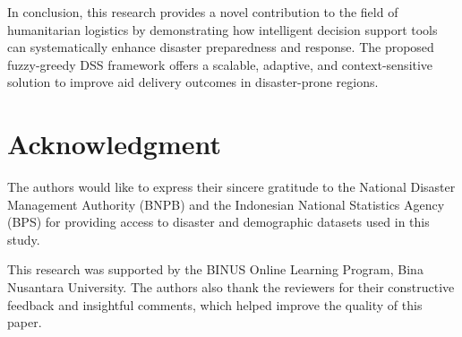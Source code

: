 \documentclass[journal,final,a4paper,twoside,11pt]{IEEEtran}
\begin{document}
In conclusion, this research provides a novel contribution to the field of humanitarian logistics by demonstrating how intelligent decision support tools can systematically enhance disaster preparedness and response. The proposed fuzzy-greedy DSS framework offers a scalable, adaptive, and context-sensitive solution to improve aid delivery outcomes in disaster-prone regions.


\section*{Acknowledgment}

The authors would like to express their sincere gratitude to the National Disaster Management Authority (BNPB) and the Indonesian National Statistics Agency (BPS) for providing access to disaster and demographic datasets used in this study. 

This research was supported by the BINUS Online Learning Program, Bina Nusantara University. The authors also thank the reviewers for their constructive feedback and insightful comments, which helped improve the quality of this paper.





 




\label{lastPage}
\end{document}
